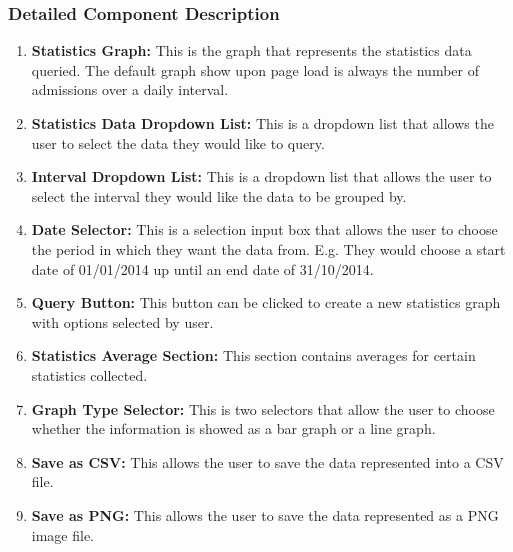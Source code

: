 \documentclass[14pt, a4paper]{article}
\begin{document}
	\subsubsection{Detailed Component Description}
		\begin{enumerate}
			\item \textbf{Statistics Graph:} This is the graph that represents the statistics data queried. The default graph show upon page load is always the number of admissions over a daily interval. 
			\item \textbf{Statistics Data Dropdown List:} This is a dropdown list that allows the user to select the data they would like to query.
			\item \textbf{Interval Dropdown List:} This is a dropdown list that allows the user to select the interval they would like the data to be grouped by.
			\item \textbf{Date Selector:} This is a selection input box that allows the user to choose the period in which they want the data from. E.g. They would choose a start date of 01/01/2014 up until an end date of 31/10/2014.
			\item \textbf{Query Button:} This button can be clicked to create a new statistics graph with options selected by user.
			\item \textbf{Statistics Average Section:} This section contains averages for certain statistics collected.
			\item \textbf{Graph Type Selector: } This is two selectors that allow the user to choose whether the information is showed as a bar graph or a line graph.
			\item \textbf{Save as CSV:} This allows the user to save the data represented into a CSV file.
			\item \textbf{Save as PNG:} This allows the user to save the data represented as a PNG image file.
		\end{enumerate}
\end{document}
